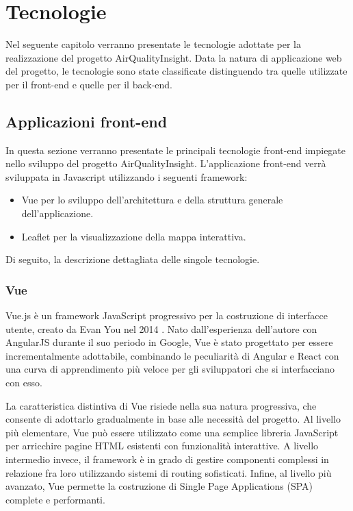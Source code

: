 \clearpage{\pagestyle{empty}\cleardoublepage}

\chapter{Tecnologie}

Nel seguente capitolo verranno presentate le tecnologie adottate per la realizzazione del progetto AirQualityInsight. Data la natura di applicazione web del progetto, le tecnologie sono state classificate distinguendo tra quelle utilizzate per il front-end e quelle per il back-end.

\section{Applicazioni front-end}

In questa sezione verranno presentate le principali tecnologie front-end impiegate nello sviluppo del progetto AirQualityInsight.
L'applicazione front-end verrà sviluppata in Javascript utilizzando i seguenti framework:
\begin{itemize}
  \item Vue per lo sviluppo dell'architettura e della struttura generale dell'applicazione.
  \item Leaflet per la visualizzazione della mappa interattiva.
\end{itemize}

Di seguito, la descrizione dettagliata delle singole tecnologie.

\subsection{Vue}

Vue.js è un framework JavaScript progressivo per la costruzione di interfacce utente, creato da Evan You nel 2014 \cite{vue2014}. Nato dall'esperienza dell'autore con AngularJS \cite{angularjs2010} durante il suo periodo in Google, Vue è stato progettato per essere incrementalmente adottabile, combinando le peculiarità di Angular e React \cite{react2013} con una curva di apprendimento più veloce per gli sviluppatori che si interfacciano con esso.

La caratteristica distintiva di Vue risiede nella sua natura progressiva, che consente di adottarlo gradualmente in base alle necessità del progetto. Al livello più elementare, Vue può essere utilizzato come una semplice libreria JavaScript per arricchire pagine HTML esistenti con funzionalità interattive. A livello intermedio invece, il framework è in grado di gestire componenti complessi in relazione fra loro utilizzando sistemi di routing sofisticati. Infine, al livello più avanzato, Vue permette la costruzione di Single Page Applications (SPA) \cite{mdn2024spa} complete e performanti.

